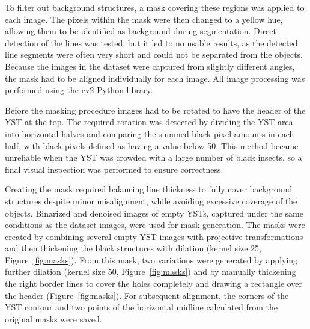 \documentclass[12pt, a4paper]{article}
\begin{document}
To filter out background structures, a mask covering these regions was applied to each image. The pixels within the mask were then changed to a yellow hue, allowing them to be identified as background during segmentation. Direct detection of the lines was tested, but it led to no usable results, as the detected line segments were often very short and could not be separated from the objects. Because the images in the dataset were captured from slightly different angles, the mask had to be aligned individually for each image. All image processing was performed using the cv2 Python library.

Before the masking procedure images had to be rotated to have the header of the YST at the top. The required rotation was detected by dividing the YST area into horizontal halves and comparing the summed black pixel amounts in each half, with black pixels defined as having a value below 50. This method became unreliable when the YST was crowded with a large number of black insects, so a final visual inspection was performed to ensure correctness.

Creating the mask required balancing line thickness to fully cover background structures despite minor misalignment, while avoiding excessive coverage of the objects. Binarized and denoised images of empty YSTs, captured under the same conditions as the dataset images, were used for mask generation. The masks were created by combining several empty YST images with projective transformations and then thickening the black structures with dilation (kernel size 25, Figure~\ref{fig:masks}). From this mask, two variations were generated by applying further dilation (kernel size 50, Figure~\ref{fig:masks}) and by manually thickening the right border lines to cover the holes completely and drawing a rectangle over the header (Figure~\ref{fig:masks}). For subsequent alignment, the corners of the YST contour and two points of the horizontal midline calculated from the original masks were saved.
\end{document}
